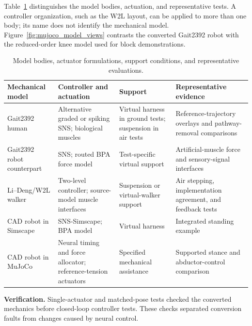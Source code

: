 Table~\ref{tab:sns_model_configurations} distinguishes the model bodies, actuation, and representative tests. A controller organization, such as the W2L layout, can be applied to more than one body; its name does not identify the mechanical model. Figure~\ref{fig:mujoco_model_views} contrasts the converted Gait2392 robot with the reduced-order knee model used for block demonstrations.

\begin{table}[htbp]
\centering\small
\caption[Neuromechanical models and representative tests]{Model bodies, actuator formulations, support conditions, and representative evaluations.}
\label{tab:sns_model_configurations}
\begingroup
\renewcommand{\arraystretch}{1.15}
\begin{tabularx}{\textwidth}{@{}>{\raggedright\arraybackslash}p{}>{\raggedright\arraybackslash}p{}>{\raggedright\arraybackslash}p{}>{\raggedright\arraybackslash}X@{}}
\toprule
\textbf{Mechanical model} & \textbf{Controller and actuation} & \textbf{Support} & \textbf{Representative evidence} \\
\midrule
Gait2392 human & Alternative graded or spiking SNS; biological muscles & Virtual harness in ground tests; suspension in air tests & Reference-trajectory overlays and pathway-removal comparisons \\
Gait2392 robot counterpart & SNS; routed BPA force model & Test-specific virtual support & Artificial-muscle force and sensory-signal interfaces \\
Li--Deng/W2L walker & Two-level controller; source-model muscle interfaces & Suspension or virtual-walker support & Air stepping, implementation agreement, and feedback tests \\
CAD robot in Simscape & SNS-Simscape; BPA model & Virtual harness & Integrated standing example \\
CAD robot in MuJoCo & Neural timing and force allocator; reference-tension actuators & Specified mechanical assistance & Supported stance and abductor-control comparison \\
\bottomrule
\end{tabularx}
\endgroup
\end{table}

\noindent\textbf{Verification.} Single-actuator and matched-pose tests checked the converted mechanics before closed-loop controller tests. These checks separated conversion faults from changes caused by neural control.

